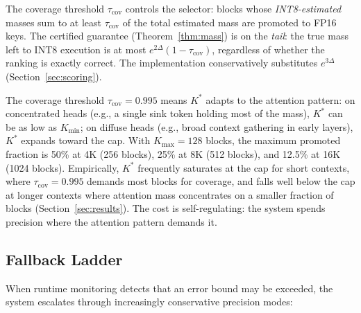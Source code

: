 \documentclass[10pt,twocolumn,a4paper]{article}
\theoremstyle{definition}
\theoremstyle{remark}
\begin{document}
The coverage threshold $\tau_{\mathrm{cov}}$ controls the selector: blocks whose \emph{INT8-estimated} masses sum to at least $\tau_{\mathrm{cov}}$ of the total estimated mass are promoted to FP16 keys.  The certified guarantee (Theorem~\ref{thm:mass}) is on the \emph{tail}: the true mass left to INT8 execution is at most $e^{2\Delta}(1 - \tau_{\mathrm{cov}})$, regardless of whether the ranking is exactly correct.  The implementation conservatively substitutes $e^{3\Delta}$ (Section~\ref{sec:scoring}).

The coverage threshold $\tau_{\mathrm{cov}} = 0.995$ means $K^*$ adapts to the attention pattern: on concentrated heads (e.g., a single sink token holding most of the mass), $K^*$ can be as low as $K_{\min}$; on diffuse heads (e.g., broad context gathering in early layers), $K^*$ expands toward the cap.  With $K_{\max}{=}128$ blocks, the maximum promoted fraction is 50\% at 4K (256 blocks), 25\% at 8K (512 blocks), and 12.5\% at 16K (1024 blocks).  Empirically, $K^*$ frequently saturates at the cap for short contexts, where $\tau_{\mathrm{cov}}{=}0.995$ demands most blocks for coverage, and falls well below the cap at longer contexts where attention mass concentrates on a smaller fraction of blocks (Section~\ref{sec:results}).  The cost is self-regulating: the system spends precision where the attention pattern demands it.

\subsection{Fallback Ladder}
\label{sec:fallback}

When runtime monitoring detects that an error bound may be exceeded, the system escalates through increasingly conservative precision modes:
\end{document}
